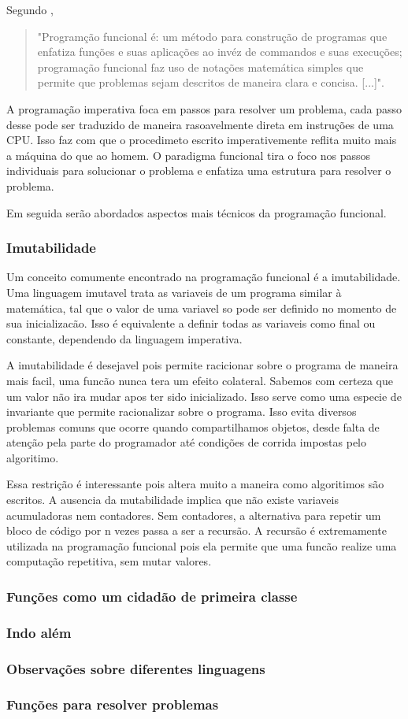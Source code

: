 Segundo \cite{Bird},
\begin{quotation}
"Programção funcional é: um método para construção de programas que enfatiza funções e suas aplicações ao invéz de commandos e suas execuções; programação funcional faz uso de notações matemática simples que permite que problemas sejam descritos de maneira clara e concisa. [...]".
\end{quotation}
A programação imperativa foca em passos para resolver um problema, cada passo desse pode ser traduzido de maneira rasoavelmente direta em instruções de uma CPU.
Isso faz com que o procedimeto escrito imperativemente reflita muito mais a máquina do que ao homem.
O paradigma funcional tira o foco nos passos individuais para solucionar o problema e enfatiza uma estrutura para resolver o problema.

Em seguida serão abordados aspectos mais técnicos da programação funcional.

\subsubsection{Imutabilidade}

Um conceito comumente encontrado na programação funcional é a imutabilidade.
Uma linguagem imutavel trata as variaveis de um programa similar à matemática, tal que o valor de uma variavel so pode ser definido no momento de sua inicializacão.
Isso é equivalente a definir todas as variaveis como final ou constante, dependendo da linguagem imperativa.

A imutabilidade é desejavel pois permite racicionar sobre o programa de maneira mais facil, uma funcão nunca tera um efeito colateral.
Sabemos com certeza que um valor não ira mudar apos ter sido inicializado.
Isso serve como uma especie de invariante que permite racionalizar sobre o programa.
Isso evita diversos problemas comuns que ocorre quando compartilhamos objetos, desde falta de atenção pela parte do programador até condições de corrida impostas pelo algoritimo.

Essa restrição é interessante pois altera muito a maneira como algoritimos são escritos.
A ausencia da mutabilidade implica que não existe variaveis acumuladoras nem contadores.
Sem contadores, a alternativa para repetir um bloco de código por n vezes passa a ser a recursão.
A recursão é extremamente utilizada na programação funcional pois ela permite que uma funcão realize uma computação repetitiva, sem mutar valores.

\subsubsection{Funções como um cidadão de primeira classe}

\subsubsection{Indo além}

\subsubsection{Observações sobre diferentes linguagens}

\subsubsection{Funções para resolver problemas}


